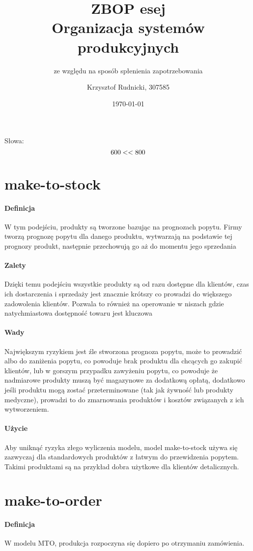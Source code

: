 \documentclass[12pt]{scrartcl}
\author{Krzysztof Rudnicki, 307585}
\title{ZBOP esej \\ Organizacja systemów produkcyjnych}
\subtitle{ze względu na sposób spłenienia zapotrzebowania}
\date{\today}
\newcommand\wordcount{
    \immediate\write18{texcount esej.tex | grep "Words in text: " | cut -d: -f2 > esej.sum}
    
}
\begin{document}
	\maketitle
	Słowa:
	\[ 600 < \wordcount < 800 \]
	\section{make-to-stock}
		\paragraph{Definicja} W tym podejściu, produkty są tworzone bazując na prognozach popytu. Firmy tworzą prognozę popytu dla danego produktu, wytwarzają na podstawie tej prognozy produkt, następnie przechowują go aż do momentu jego sprzedania
		\paragraph{Zalety} Dzięki temu podejściu wszystkie produkty są od razu dostępne dla klientów, czas ich dostarczenia i sprzedaży jest znacznie krótszy co prowadzi do większego zadowolenia klientów. Pozwala to również na operowanie w niszach gdzie natychmiastowa dostępność towaru jest kluczowa
		\paragraph{Wady} Największym ryzykiem jest źle stworzona prognoza popytu, może to prowadzić albo do zaniżenia popytu, co powoduje brak produktu dla chcących go zakupić klientów, lub w gorszym przypadku zawyżeniu popytu, co powoduje że nadmiarowe produkty muszą być magazynowe za dodatkową opłatą, dodatkowo jeśli produktu mogą zostać przeterminowane (tak jak żywność lub produkty medyczne), prowadzi to do zmarnowania produktów i kosztów związanych z ich wytworzeniem.
		\paragraph{Użycie} Aby uniknąć ryzyka złego wyliczenia modelu, model make-to-stock używa się zazwyczaj dla standardowych produktów z łatwym do przewidzenia popytem. Takimi produktami są na przykład dobra użytkowe dla klientów detalicznych.
		
	\section{make-to-order}
		\paragraph{Definicja} W modelu MTO, produkcja rozpoczyna się dopiero po otrzymaniu zamówienia. 
\end{document}
